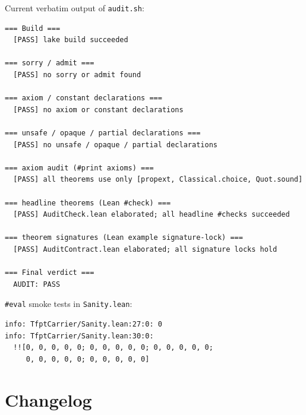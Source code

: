 Current verbatim output of \texttt{audit.sh}:

\begin{lstlisting}
=== Build ===
  [PASS] lake build succeeded

=== sorry / admit ===
  [PASS] no sorry or admit found

=== axiom / constant declarations ===
  [PASS] no axiom or constant declarations

=== unsafe / opaque / partial declarations ===
  [PASS] no unsafe / opaque / partial declarations

=== axiom audit (#print axioms) ===
  [PASS] all theorems use only [propext, Classical.choice, Quot.sound]

=== headline theorems (Lean #check) ===
  [PASS] AuditCheck.lean elaborated; all headline #checks succeeded

=== theorem signatures (Lean example signature-lock) ===
  [PASS] AuditContract.lean elaborated; all signature locks hold

=== Final verdict ===
  AUDIT: PASS
\end{lstlisting}

\texttt{\#eval} smoke tests in \texttt{Sanity.lean}:

\begin{lstlisting}
info: TfptCarrier/Sanity.lean:27:0: 0
info: TfptCarrier/Sanity.lean:30:0:
  !![0, 0, 0, 0, 0; 0, 0, 0, 0, 0; 0, 0, 0, 0, 0;
     0, 0, 0, 0, 0; 0, 0, 0, 0, 0]
\end{lstlisting}

\section{Changelog}
\label{sec:changes}

